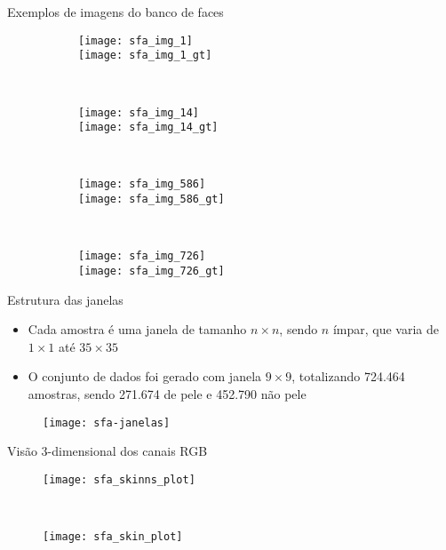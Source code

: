 \begin{frame}{Exemplos de imagens do banco de faces}
\begin{figure}[h]
    \centering
    \begin{subfigure}[t]{0.17\textwidth}
        \texttt{[image: sfa\_img\_1]}\\
        \texttt{[image: sfa\_img\_1\_gt]}
    \end{subfigure}
    ~
    \begin{subfigure}[t]{0.17\textwidth}
        \texttt{[image: sfa\_img\_14]}\\
        \texttt{[image: sfa\_img\_14\_gt]}
    \end{subfigure}
    ~
    \begin{subfigure}[t]{0.17\textwidth}
        \texttt{[image: sfa\_img\_586]}\\
        \texttt{[image: sfa\_img\_586\_gt]}
    \end{subfigure}
    ~ %
    \begin{subfigure}[t]{0.17\textwidth}
        \texttt{[image: sfa\_img\_726]}\\
        \texttt{[image: sfa\_img\_726\_gt]}
    \end{subfigure}
\end{figure}
\end{frame}

\begin{frame}{Estrutura das janelas}
  \begin{itemize}
      \item Cada amostra é uma janela de tamanho $n\times n$, sendo $n$ ímpar, que varia de $1 \times 1$ até $35 \times 35$
      
      \item O conjunto de dados foi gerado com janela $9 \times 9$, totalizando 724.464 amostras, sendo 271.674 de pele e 452.790 não pele
  \end{itemize}

  \begin{figure}
    \centering
    \texttt{[image: sfa-janelas]}
  \end{figure}
\end{frame}

\begin{frame}{Visão 3-dimensional dos canais RGB}
\begin{figure}[h]
    \centering
    \begin{minipage}{0.45\textwidth}
        \texttt{[image: sfa\_skinns\_plot]}
    \end{minipage}
    ~ %
    \begin{minipage}{0.45\textwidth}
        \texttt{[image: sfa\_skin\_plot]}
    \end{minipage}
\end{figure}
\end{frame}

